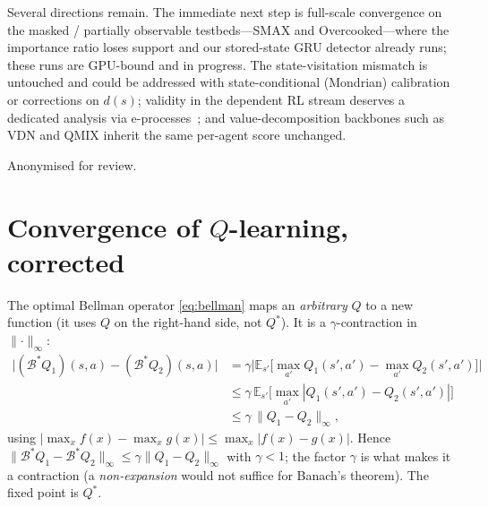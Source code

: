 \documentclass[sigconf]{aamas}
\newcommand{\Bop}{\mathcal{B}}
\begin{document}
\balance

Several directions remain. The immediate next step is full-scale convergence on
the masked / partially observable testbeds---SMAX and Overcooked---where the
importance ratio loses support and our stored-state GRU detector already runs;
these runs are GPU-bound and in progress. The state-visitation mismatch is
untouched and could be addressed with state-conditional (Mondrian) calibration or
corrections on $d(s)$; validity in the dependent RL stream deserves a dedicated
analysis via e-processes~\cite{ramdas2023gametheoretic}; and value-decomposition
backbones such as VDN and QMIX inherit the same per-agent score unchanged.

\begin{acks}
Anonymised for review.
\end{acks}




\appendix

\section{Convergence of $Q$-learning, corrected}
\label{app:contraction}
The optimal Bellman operator \eqref{eq:bellman} maps an \emph{arbitrary} $Q$ to a
new function (it uses $Q$ on the right-hand side, not $Q^*$). It is a
$\gamma$-contraction in $\lVert\cdot\rVert_\infty$:
\begin{align*}
\big|(\Bop^*Q_1)(s,a)-(\Bop^*Q_2)(s,a)\big|
&=\gamma\Big|\mathbb{E}_{s'}\big[\textstyle\max_{a'}Q_1(s',a')-\max_{a'}Q_2(s',a')\big]\Big|\\
&\le\gamma\,\mathbb{E}_{s'}\big[\textstyle\max_{a'}|Q_1(s',a')-Q_2(s',a')|\big]\\
&\le\gamma\,\lVert Q_1-Q_2\rVert_\infty,
\end{align*}
using $|\max_x f(x)-\max_x g(x)|\le\max_x|f(x)-g(x)|$. Hence
$\lVert\Bop^*Q_1-\Bop^*Q_2\rVert_\infty\le\gamma\lVert Q_1-Q_2\rVert_\infty$ with
$\gamma<1$; the factor $\gamma$ is what makes it a contraction (a
\emph{non-expansion} would not suffice for Banach's theorem). The fixed point is
$Q^*$.
\end{document}
